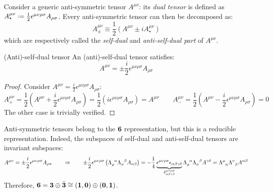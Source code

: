 Consider a generic anti-symmetric tensor $ A^{\mu \nu} $: its \textit{dual tensor} is defined as $ A_\star^{\mu \nu} \defeq \frac{1}{2} \epsilon^{\mu \nu \rho \sigma} A_{\rho \sigma} $. Every anti-symmetric tensor can then be decomposed as:
\begin{equation}
  A^{\mu \nu}_{\pm} \equiv \frac{1}{2} \left( A^{\mu \nu} \pm i A_\star^{\mu \nu} \right)
\end{equation}
which are respectively called the \textit{self-dual} and \textit{anti-self-dual part} of $ A^{\mu \nu} $.

\begin{lemma}{(Anti)-self-dual tensor}{}
  An (anti)-self-dual tensor satisfies:
  \begin{equation}
    A^{\mu \nu} = \pm \frac{i}{2} \epsilon^{\mu \nu \rho \sigma} A_{\rho \sigma}
  \end{equation}
\end{lemma}

\begin{proofbox}
  \begin{proof}
    Consider $ A^{\mu \nu} = \frac{i}{2} \epsilon^{\mu \nu \rho \sigma} A_{\rho \sigma} $:
    \begin{equation*}
      A^{\mu \nu}_+ = \frac{1}{2} \left( A^{\mu \nu} + \frac{i}{2} \epsilon^{\mu \nu \rho \sigma} A_{\rho \sigma} \right) = \frac{1}{2} \left( i \epsilon^{\mu \nu \rho \sigma} A_{\rho \sigma} \right) = A^{\mu \nu}
      \qquad
      A^{\mu \nu}_- = \frac{1}{2} \left( A^{\mu \nu} - \frac{i}{2} \epsilon^{\mu \nu \rho \sigma} A_{\rho \sigma} \right) = 0
    \end{equation*}
    The other case is trivially verified.
  \end{proof}
\end{proofbox}

Anti-symmetric tensors belong to the $ \mathbf{6} $ representation, but this is a reducible representation. Indeed, the subspaces of self-dual and anti-self-dual tensors are invariant subspaces:
\begin{equation*}
  A^{\mu \nu} = \pm \frac{i}{2} \epsilon^{\mu \nu \rho \sigma} A_{\rho \sigma}
  \qquad \Rightarrow \qquad
  \pm \frac{i}{2} \epsilon^{\mu \nu \rho \sigma} \left( \tensor{\Lambda}{_\rho^\alpha} \tensor{\Lambda}{_\sigma^\beta} A_{\alpha \beta} \right) = - \frac{1}{4} \underbrace{\epsilon^{\mu \nu \rho \sigma} \epsilon_{\alpha \beta \gamma \delta}}_{\delta^{\mu \nu \rho \sigma}_{\alpha \beta \gamma \delta}} \tensor{\Lambda}{_\rho^\alpha} \tensor{\Lambda}{_\sigma^\beta} A^{\gamma \delta} = \tensor{\Lambda}{^\mu_\alpha} \tensor{\Lambda}{^\nu_\beta} A^{\alpha \beta}
\end{equation*}
Therefore, $ \mathbf{6} = \mathbf{3} \oplus \bar{\mathbf{3}} \cong \mathbf{\left( 1,0 \right)} \oplus \mathbf{\left( 0,1 \right)} $.

